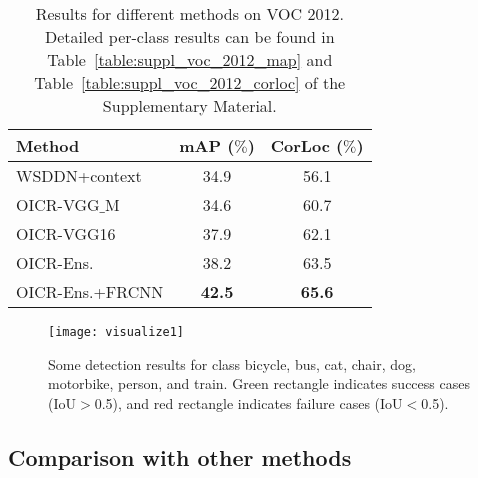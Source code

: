 \documentclass[10pt,twocolumn,letterpaper]{article}
\def\methodname{OICR}
\begin{document}
\begin{table}[t]
\begin{center}
\footnotesize
\begin{tabular}{|l|c|c|}
   \hline
   Method & mAP ($\%$) & CorLoc ($\%$) \\
   \hline\hline
   WSDDN+context \cite{Ref:Kantorov2016} & 34.9 & 56.1 \\
   \hline
   \methodname-VGG$\_$M & 34.6 & 60.7\\
   \methodname-VGG16 & 37.9 & 62.1\\
   \hline
   \methodname-Ens. & 38.2 & 63.5 \\
   \methodname-Ens.+FRCNN & \bf{42.5} & \bf{65.6} \\
   \hline
\end{tabular}
\end{center}
\caption{Results for different methods on VOC 2012. Detailed per-class results can be found in Table~\ref{table:suppl_voc_2012_map} and Table~\ref{table:suppl_voc_2012_corloc} of the Supplementary Material.}
\label{table:voc_2012}
\end{table}


\begin{figure*}[!t]
\begin{center}
   \texttt{[image: visualize1]}
\end{center}
   \caption{Some detection results for class bicycle, bus, cat, chair, dog, motorbike, person, and train.
   Green rectangle indicates success cases (IoU$>$0.5), and red rectangle indicates failure cases (IoU$<$0.5).}
\label{fig:visualize1}
\end{figure*}



\subsection{Comparison with other methods}
\label{sec:compar}
\end{document}
